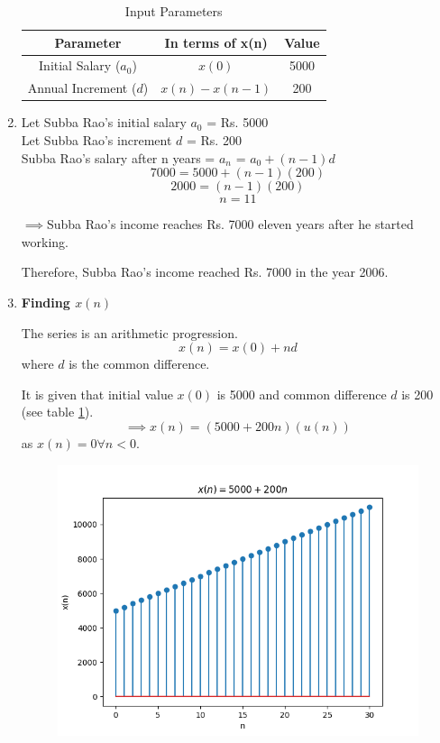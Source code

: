 \documentclass[journal,12pt,twocolumn]{IEEEtran}
\theoremstyle{remark}
\begin{document}
\begin{enumerate}
\begin{table}[h!]
    \centering
    \caption{Input Parameters}
    \label{tab:1}
    \begin{tabular}{ | c | c | c | }
        \hline
        Parameter & In terms of x(n) & Value \\
        \hline
        Initial Salary ($a_0$) & $x(0)$ & 5000 \\
        Annual Increment ($d$) & $x(n) - x(n - 1)$ & 200 \\
        \hline
    \end{tabular}
\end{table}
\item
Let Subba Rao's initial salary $a_0$ = Rs. 5000
\\
Let Subba Rao's increment $d$ = Rs. 200
\\
Subba Rao's salary after n years = $a_n$ = $a_0 + (n - 1)d$
\\
\[7000 = 5000 + (n - 1)(200)\]
\[2000 = (n - 1)(200)\]
\[n = 11\]

$\implies$Subba Rao's income reaches Rs. 7000 eleven years after he started working.

Therefore, Subba Rao's income reached Rs. 7000 in the year 2006.

\item \textbf{Finding $x(n)$}

The series is an arithmetic progression.
\[x(n) = x(0) + nd\]
where $d$ is the common difference.

It is given that initial value $x(0)$ is 5000 and common difference $d$ is 200 (see table \ref{tab:1}).
\[\implies x(n) = (5000 + 200n)(u(n))\]
as $x(n) = 0 \forall n < 0$.

\begin{figure}[h!]
    \centering
    \includegraphics[width=\columnwidth]{figs/10_5_2_19.png}
\end{figure}


\end{enumerate}
\end{document}
